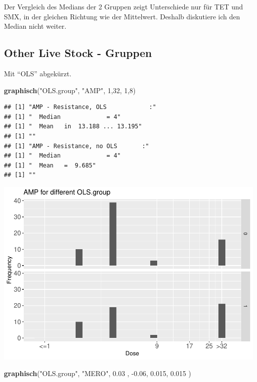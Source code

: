 \documentclass[
]{article}
\newenvironment{Shaded}{\begin{snugshade}}{\end{snugshade}}
\newcommand{\DecValTok}[1]{\textcolor[rgb]{0.00,0.00,0.81}{#1}}
\newcommand{\FloatTok}[1]{\textcolor[rgb]{0.00,0.00,0.81}{#1}}
\newcommand{\KeywordTok}[1]{\textcolor[rgb]{0.13,0.29,0.53}{\textbf{#1}}}
\newcommand{\NormalTok}[1]{#1}
\newcommand{\StringTok}[1]{\textcolor[rgb]{0.31,0.60,0.02}{#1}}
\begin{document}
Der Vergleich des Medians der 2 Gruppen zeigt Unterschiede nur für TET
und SMX, in der gleichen Richtung wie der Mittelwert. Deshalb diskutiere
ich den Median nicht weiter.

\hypertarget{other-live-stock---gruppen}{%
\subsection{Other Live Stock -
Gruppen}\label{other-live-stock---gruppen}}

Mit ``OLS'' abgekürzt.

\begin{Shaded}
\begin{Highlighting}[]
  \KeywordTok{graphisch}\NormalTok{(}\StringTok{"OLS.group"}\NormalTok{, }\StringTok{"AMP"}\NormalTok{, }\DecValTok{1}\NormalTok{,}\DecValTok{32}\NormalTok{, }\DecValTok{1}\NormalTok{,}\DecValTok{8}\NormalTok{)}
\end{Highlighting}
\end{Shaded}

\begin{verbatim}
## [1] "AMP - Resistance, OLS            :"
## [1] "  Median             = 4"
## [1] "  Mean   in  13.188 ... 13.195"
## [1] ""
## [1] "AMP - Resistance, no OLS       :"
## [1] "  Median             = 4"
## [1] "  Mean   =  9.685"
## [1] ""
\end{verbatim}

\includegraphics{Verteilungen_files/figure-latex/unnamed-chunk-18-1.pdf}

\begin{Shaded}
\begin{Highlighting}[]
  \KeywordTok{graphisch}\NormalTok{(}\StringTok{"OLS.group"}\NormalTok{, }\StringTok{"MERO"}\NormalTok{, }\FloatTok{0.03}\NormalTok{ ,  }\FloatTok{-0.06}\NormalTok{,   }\FloatTok{0.015}\NormalTok{,   }\FloatTok{0.015}\NormalTok{ )}
\end{Highlighting}
\end{Shaded}
\end{document}
